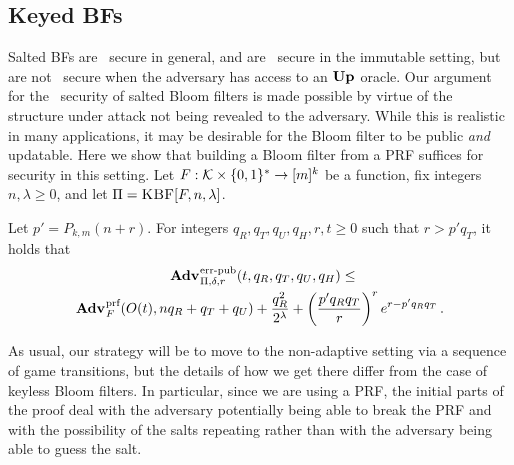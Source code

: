 %  

\subsection{Keyed BFs}

Salted BFs are \erreps\ secure in general, and are \errep\ secure in the
immutable setting, but are not \errep\ secure when the adversary has access to
an $\textup{\textbf{Up}}\hspace{0.5pt}$ oracle. Our argument for the \erreps\ security of
salted Bloom filters is made possible by virtue of the structure under attack
not being revealed to the adversary. While this is realistic in many
applications, it may be desirable for the Bloom filter to be public \emph{and}
updatable.
%
Here we show that building a Bloom filter from a PRF suffices for security in
this setting.
%
Let $F:\mathcal{K}\times\{0,1\}^*\to[m]^k$ be a function, fix
integers~$n,\lambda\geq0$, and let $\Pi = \textnormal{\textsc{KBF}}[F,n,\lambda]$.

\begin{theorem}
\label{thm:bf-key-bound}
\label{thm:kbf-errep}
  Let $p' = P_{k,m}(n+r)$.  For integers $q_R, q_T, q_U, q_H, r, t \geq 0$ such that
  $r > p'q_T$, it holds that
  \begin{equation*}
    \begin{aligned}
      \Adv{\errep}_{\Pi,\delta,r}(t,\,&q_R,q_T,q_U,q_H) \leq \\
        \Adv{\prf}_F(O(t),nq_R+q_T+q_U) & +
      \frac{q_R^2}{2^\lambda} +
      \left(\frac{p'q_Rq_T}{r}\right)^re^{r-p'q_Rq_T} \,.
    \end{aligned}
  \end{equation*}
\end{theorem}

As usual, our strategy will be to move to the non-adaptive setting via a
sequence of game transitions, but the details of how we get there differ from
the case of keyless Bloom filters.  In particular, since we are using a PRF, the
initial parts of the proof deal with the adversary potentially being able to
break the PRF and with the possibility of the salts repeating rather than with
the adversary being able to guess the salt.


